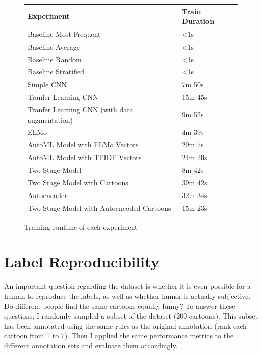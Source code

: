 \documentclass[draft,final,oneside]{vutinfth} %
\begin{document}
\begin{figure}
\centering
\begin{tabular}{|l|l|} 
\hline
\textbf{Experiment}                                    & \textbf{Train Duration}  \\ 
\hline
Baseline Most Frequent                        & \textless{}1s   \\
Baseline Average                              & \textless{}1s   \\
Baseline Random                               & \textless{}1s   \\
Baseline Stratified                           & \textless{}1s   \\
Simple CNN                                    & 7m 50s          \\
Tranfer Learning CNN                          & 15m 45s         \\
Tranfer Learning CNN (with data augmentation) & 9m 52s          \\
ELMo                                          & 4m 39s          \\
AutoML Model with ELMo Vectors                & 29m 7s          \\
AutoML Model with TFIDF Vectors               & 24m 20s         \\
Two Stage Model                               & 8m 42s          \\
Two Stage Model with Cartoons                 & 39m 42s         \\
Autoencoder                                   & 32m 34s         \\
Two Stage Model with Autoencoded Cartoons     & 15m 23s         \\
\hline
\end{tabular}
\caption{Training runtime of each experiment}
\label{trainingruntime}
\end{figure}

\section{Label Reproducibility}

An important question regarding the dataset is whether it is even possible for a human to reproduce the labels, as well as whether humor is actually subjective. Do different people find the same cartoons equally funny? To answer these questions, I randomly sampled a subset of the dataset (200 cartoons). This subset has been annotated using the same rules as the original annotation (rank each cartoon from 1 to 7). Then I applied the same performance metrics to the different annotation sets and evaluate them accordingly.
\end{document}
